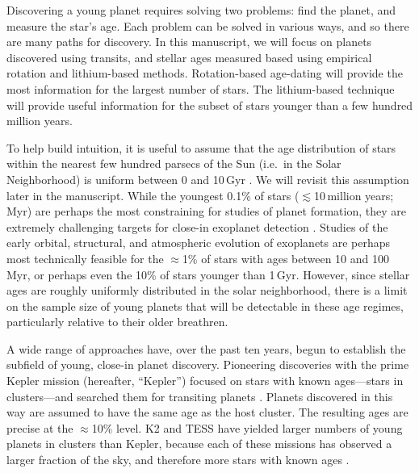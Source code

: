 \documentclass[11pt,twocolumn,tighten]{aastex63}
\begin{document}
Discovering a young planet requires solving two problems: find the
planet, and measure the star's age.  Each problem can be solved in
various ways, and so there are many paths for discovery.  In this
manuscript, we will focus on planets discovered using transits, and
stellar ages measured based using empirical rotation and lithium-based
methods.  Rotation-based age-dating will provide the most information
for the largest number of stars.  The lithium-based technique will
provide useful information for the subset of stars younger than a few
hundred million years.

To help build intuition, it is useful to assume that the age
distribution of stars within the nearest few hundred parsecs of the
Sun (i.e.~in the Solar Neighborhood) is uniform between 0 and 10\,Gyr
\citep{Nordstrom_2004}.  We will revisit this assumption later in the
manuscript.  While the youngest 0.1\% of stars ($\lesssim$10\,million
years; Myr) are perhaps the most constraining for studies of planet
formation, they are extremely challenging targets for close-in
exoplanet detection 
\citep[see e.g.][]{Damasso_2020,Bouma_2020_ptfo,Donati_2020}.  Studies of
the early orbital, structural, and atmospheric evolution of exoplanets
are perhaps most technically feasible for the $\approx$1\% of stars
with ages between 10 and 100\,Myr, or perhaps even the 10\% of stars
younger than 1\,Gyr.  However, since stellar ages are roughly
uniformly distributed in the solar neighborhood, there is a limit on
the sample size of young planets that will be detectable in these age
regimes, particularly relative to their older breathren.

A wide range of approaches have, over the past ten years, begun to
establish the subfield of young, close-in planet discovery.
Pioneering discoveries with the prime Kepler mission (hereafter,
``Kepler'') focused on stars with known ages---stars in clusters---and
searched them for transiting planets \citep{Meibom_2013}.  Planets
discovered in this way are assumed to have the same age as the host
cluster.  The
resulting ages are precise at the $\approx$10\% level.  K2
and TESS have yielded larger numbers of young planets in clusters than
Kepler, because each of these missions has observed a larger fraction
of the sky, and therefore more stars with known ages
\citep[e.g.][]{Mann_K2_25_2016,Mann_2017,Curtis_2018,Livingston_2018,David_2019,Bouma_2020_toi837,Rizzuto_2020,Plavchan_2020,Newton_2021,Nardiello_2022,Tofflemire_2021,Zhou_2022,Zakhozhay_2022,Wood_2023}.
\end{document}
